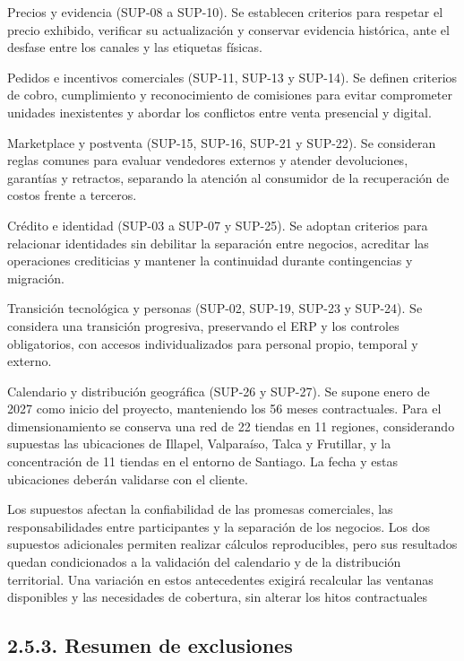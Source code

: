 \documentclass[11pt]{article}
\begin{document}
Precios y evidencia (SUP-08 a SUP-10). Se establecen criterios para respetar el precio exhibido, verificar su actualización y conservar evidencia histórica, ante el desfase entre los canales y las etiquetas físicas.

Pedidos e incentivos comerciales (SUP-11, SUP-13 y SUP-14). Se definen criterios de cobro, cumplimiento y reconocimiento de comisiones para evitar comprometer unidades inexistentes y abordar los conflictos entre venta presencial y digital.

Marketplace y postventa (SUP-15, SUP-16, SUP-21 y SUP-22). Se consideran reglas comunes para evaluar vendedores externos y atender devoluciones, garantías y retractos, separando la atención al consumidor de la recuperación de costos frente a terceros.

Crédito e identidad (SUP-03 a SUP-07 y SUP-25). Se adoptan criterios para relacionar identidades sin debilitar la separación entre negocios, acreditar las operaciones crediticias y mantener la continuidad durante contingencias y migración.

Transición tecnológica y personas (SUP-02, SUP-19, SUP-23 y SUP-24). Se considera una transición progresiva, preservando el ERP y los controles obligatorios, con accesos individualizados para personal propio, temporal y externo.

Calendario y distribución geográfica (SUP-26 y SUP-27). Se supone enero de 2027 como inicio del proyecto, manteniendo los 56 meses contractuales. Para el dimensionamiento se conserva una red de 22 tiendas en 11 regiones, considerando supuestas las ubicaciones de Illapel, Valparaíso, Talca y Frutillar, y la concentración de 11 tiendas en el entorno de Santiago. La fecha y estas ubicaciones deberán validarse con el cliente.

Los supuestos afectan la confiabilidad de las promesas comerciales, las responsabilidades entre participantes y la separación de los negocios. Los dos supuestos adicionales permiten realizar cálculos reproducibles, pero sus resultados quedan condicionados a la validación del calendario y de la distribución territorial. Una variación en estos antecedentes exigirá recalcular las ventanas disponibles y las necesidades de cobertura, sin alterar los hitos contractuales

\subsection{2.5.3. Resumen de exclusiones}\label{resumen-de-exclusiones}
\end{document}
